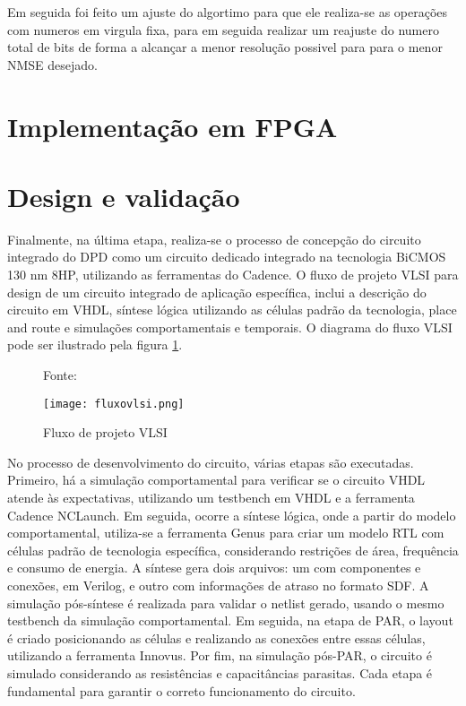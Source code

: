 

Em seguida foi feito um ajuste do algortimo para que ele realiza-se as operações com numeros em virgula fixa, para em seguida realizar um reajuste do numero total de bits de forma a alcançar a menor resolução possivel para para o menor NMSE desejado. 

\section{Implementação em FPGA}


\section{Design e validação}
Finalmente, na última etapa, realiza-se o processo de concepção do circuito integrado do DPD como um circuito dedicado integrado na tecnologia BiCMOS 130 nm 8HP, utilizando as ferramentas do Cadence.
O fluxo de projeto VLSI  para design de um circuito integrado de aplicação específica, inclui a descrição do circuito em VHDL, síntese lógica utilizando as células padrão da tecnologia, place and route e simulações comportamentais e temporais. O diagrama do fluxo VLSI pode ser ilustrado pela figura \ref{fig:CMOS2010}.

\begin{figure}[ht!]
    \centering
    \captionsetup{justification=centering}
    \caption*{Fonte: \cite{CMOS2010}}
    \texttt{[image: fluxovlsi.png]}
    \caption{Fluxo de projeto VLSI}
    \label{fig:CMOS2010}
\end{figure}

No processo de desenvolvimento do circuito, várias etapas são executadas. Primeiro, há a simulação comportamental para verificar se o circuito VHDL atende às expectativas, utilizando um testbench em VHDL e a ferramenta Cadence NCLaunch. Em seguida, ocorre a síntese lógica, onde a partir do modelo comportamental, utiliza-se a ferramenta Genus para criar um modelo RTL com células padrão de tecnologia específica, considerando restrições de área, frequência e consumo de energia. A síntese gera dois arquivos: um com componentes e conexões, em Verilog, e outro com informações de atraso no formato SDF. A simulação pós-síntese é realizada para validar o netlist gerado, usando o mesmo testbench da simulação comportamental. Em seguida, na etapa de PAR, o layout é criado posicionando as células e realizando as conexões entre essas células, utilizando a ferramenta Innovus. Por fim, na simulação pós-PAR, o circuito é simulado considerando as resistências e capacitâncias parasitas. Cada etapa é fundamental para garantir o correto funcionamento do circuito.

